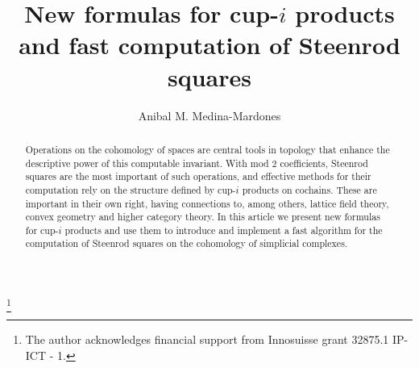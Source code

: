 \documentclass{amsart}
\theoremstyle{definition}
\begin{document}
	
	\title{New formulas for cup-$i$ products and fast computation of Steenrod squares}
	\author{Anibal M. Medina-Mardones}
	\thanks{The author acknowledges financial support from Innosuisse grant 32875.1 IP-ICT - 1.}
	\address{Max Planck Institute for Mathematics in Bonn}
	\address{Department of Mathematics, University of Notre Dame}
	
	\begin{abstract}
		Operations on the cohomology of spaces are central tools in topology that enhance the descriptive power of this computable invariant.
		With mod 2 coefficients, Steenrod squares are the most important of such operations, and effective methods for their computation rely on the structure defined by cup-$i$ products on cochains.
		These are important in their own right, having connections to, among others, lattice field theory, convex geometry and higher category theory.
		In this article we present new formulas for cup-$i$ products and use them to introduce and implement a fast algorithm for the computation of Steenrod squares on the cohomology of simplicial complexes.
	\end{abstract}
	
	\maketitle
	\tableofcontents	
	
	
	
	
	
	
	
	
	
	
	
\end{document}
